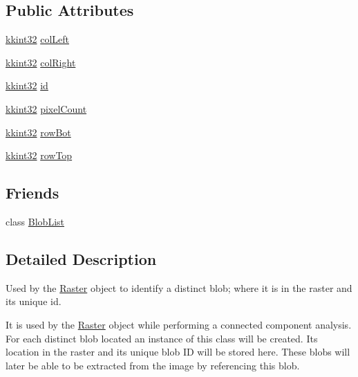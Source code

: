 \subsection*{Public Attributes}
\begin{DoxyCompactItemize}
\item 
\hyperlink{namespace_k_k_b_a8fa4952cc84fda1de4bec1fbdd8d5b1b}{kkint32} \hyperlink{class_k_k_b_1_1_blob_a1d47c1a8131e60211a3dd91910699318}{col\+Left}
\item 
\hyperlink{namespace_k_k_b_a8fa4952cc84fda1de4bec1fbdd8d5b1b}{kkint32} \hyperlink{class_k_k_b_1_1_blob_a3786c83aeb9b92bc076c14afcc99c463}{col\+Right}
\item 
\hyperlink{namespace_k_k_b_a8fa4952cc84fda1de4bec1fbdd8d5b1b}{kkint32} \hyperlink{class_k_k_b_1_1_blob_af752299192d447637bd6c56d4b1e0660}{id}
\item 
\hyperlink{namespace_k_k_b_a8fa4952cc84fda1de4bec1fbdd8d5b1b}{kkint32} \hyperlink{class_k_k_b_1_1_blob_a415767d4a364df537d7b2fc06a95721d}{pixel\+Count}
\item 
\hyperlink{namespace_k_k_b_a8fa4952cc84fda1de4bec1fbdd8d5b1b}{kkint32} \hyperlink{class_k_k_b_1_1_blob_ae6f6816134ac19c54071eca96dd89910}{row\+Bot}
\item 
\hyperlink{namespace_k_k_b_a8fa4952cc84fda1de4bec1fbdd8d5b1b}{kkint32} \hyperlink{class_k_k_b_1_1_blob_adeb391a75a10791e7f59566eafa847ae}{row\+Top}
\end{DoxyCompactItemize}
\subsection*{Friends}
\begin{DoxyCompactItemize}
\item 
class \hyperlink{class_k_k_b_1_1_blob_a3eaa10f55ee0c5c1f0641b324c6d95c5}{Blob\+List}
\end{DoxyCompactItemize}


\subsection{Detailed Description}
Used by the \hyperlink{class_k_k_b_1_1_raster}{Raster} object to identify a distinct blob; where it is in the raster and its unique id. 

It is used by the \hyperlink{class_k_k_b_1_1_raster}{Raster} object while performing a connected component analysis. For each distinct blob located an instance of this class will be created. Its location in the raster and its unique blob ID will be stored here. These blobs will later be able to be extracted from the image by referencing this blob.

